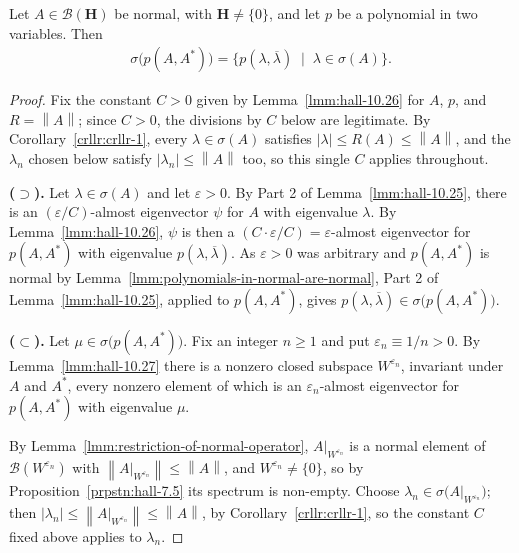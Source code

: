 \begin{theorem}
    \label{thrm:hall-10.23}
    \leanok
    Let $A \in \mathcal{B}(\mathbf{H})$ be normal, with $\mathbf{H} \ne \{0\}$, and let $p$ be a polynomial in two variables. Then
    \begin{align}
        \sigma\big( p(A,A^*) \big) = \big\{ p(\lambda,\overline\lambda) \;\mid\; \lambda \in \sigma(A) \big\}.
    \end{align}
\end{theorem}
\begin{proof}
    \leanok
Fix the constant $C > 0$ given by Lemma~\ref{lmm:hall-10.26} for $A$, $p$, and $R = \left\| A \right\|$; since $C > 0$, the divisions by $C$ below are legitimate. By Corollary~\ref{crllr:crllr-1}, every $\lambda \in \sigma(A)$ satisfies $\lvert \lambda \rvert \le R(A) \le \left\| A \right\|$, and the $\lambda_n$ chosen below satisfy $\lvert \lambda_n \rvert \le \left\| A \right\|$ too, so this single $C$ applies throughout.

\textbf{($\supset$).} Let $\lambda \in \sigma(A)$ and let $\varepsilon > 0$. By Part 2 of Lemma~\ref{lmm:hall-10.25}, there is an $(\varepsilon/C)$-almost eigenvector $\psi$ for $A$ with eigenvalue $\lambda$. By Lemma~\ref{lmm:hall-10.26}, $\psi$ is then a $(C \cdot \varepsilon/C) = \varepsilon$-almost eigenvector for $p(A,A^*)$ with eigenvalue $p(\lambda,\overline\lambda)$. As $\varepsilon>0$ was arbitrary and $p(A,A^*)$ is normal by Lemma~\ref{lmm:polynomials-in-normal-are-normal}, Part 2 of Lemma~\ref{lmm:hall-10.25}, applied to $p(A,A^*)$, gives $p(\lambda,\overline\lambda) \in \sigma\big(p(A,A^*)\big)$.

\textbf{($\subset$).} Let $\mu \in \sigma\big(p(A,A^*)\big)$. Fix an integer $n \ge 1$ and put $\varepsilon_n \equiv 1/n > 0$. By Lemma~\ref{lmm:hall-10.27} there is a nonzero closed subspace $W^{\varepsilon_n}$, invariant under $A$ and $A^*$, every nonzero element of which is an $\varepsilon_n$-almost eigenvector for $p(A,A^*)$ with eigenvalue $\mu$.

By Lemma~\ref{lmm:restriction-of-normal-operator}, $A\vert_{W^{\varepsilon_n}}$ is a normal element of $\mathcal{B}(W^{\varepsilon_n})$ with $\left\| A\vert_{W^{\varepsilon_n}} \right\| \le \left\| A \right\|$, and $W^{\varepsilon_n} \ne \{0\}$, so by Proposition~\ref{prpstn:hall-7.5} its spectrum is non-empty. Choose $\lambda_n \in \sigma\big( A\vert_{W^{\varepsilon_n}} \big)$; then $\lvert \lambda_n \rvert \le \left\| A\vert_{W^{\varepsilon_n}} \right\| \le \left\| A \right\|$, by Corollary~\ref{crllr:crllr-1}, so the constant $C$ fixed above applies to $\lambda_n$.


\end{proof}
